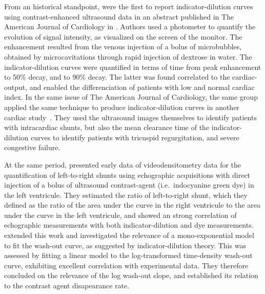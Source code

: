 From an historical standpoint, \citet{Bommer:1978eu} were the first to report indicator-dilution curves using contrast-enhanced ultrasound data in an abstract published in The American Journal of Cardiology in \citeyear{Bommer:1978eu}. %
Authors used a photometer to quantify the evolution of signal intensity, as visualized on the screen of the monitor.
The enhancement resulted from the venous injection of a bolus of microbubbles, obtained by microcavitations through rapid injection of dextrose in water. 
The indicator-dilution curves were quantified in terms of time from peak enhancement to 50\% decay, and to 90\% decay. 
The latter was found correlated to the cardiac-output, and enabled the differenciation of patients with low and normal cardiac index. 
In the same issue of The American Journal of Cardiology, the same group applied the same technique to produce indicator-dilution curves in another cardiac study~\cite{DeMaria:1978il}. %
They used the ultrasound images themselves to identify patients with intracardiac shunts, but also the mean clearance time of the indicator-dilution curves to identify patients with tricuspid regurgitation, and severe congestive failure.

At the same period, \citet{Hagler:1982hs} presented early data of videodensitometry data for the quantification of left-to-right shunts using echographic acquisitions with direct injection of a bolus of ultrasound contrast-agent (i.e.~indocyanine green dye) in the left ventricule. %
They estimated the ratio of left-to-right shunt, which they defined as the ratio of the area under the curve in the right ventricule to the area under the curve in the left ventricule, and showed an strong correlation of echographic measurements with both indicator-dilution and dye measurements.
\citet{Meltzer:1982vt} extended this work and investigated the relevance of a mono-exponential model to fit the wash-out curve, as suggested by indicator-dilution theory. %
This was assessed by fitting a linear model to the log-transformed time-density wash-out curve, exhibiting excellent correlation with experimental data. 
They therefore concluded on the relevance of the log wash-out slope, and established its relation to the contrast agent disapearance rate. 

